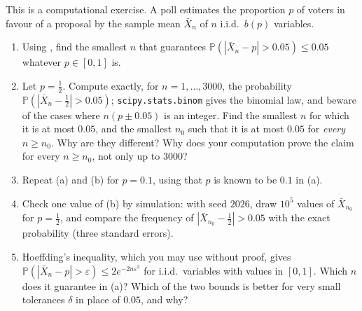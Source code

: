\begin{exercise}\label{ex:ll-chebyshev-bernoulli}
\medium This is a computational exercise. A poll estimates the proportion $p$ of voters in favour
of a proposal by the sample mean $\bar X_n$ of $n$ i.i.d.\ $b(p)$ variables.
\begin{enumerate}[label=(\alph*)]
  \item Using , find the smallest $n$ that guarantees
    $\mathbb P(|\bar X_n-p|>0.05)\le0.05$ whatever $p\in[0,1]$ is.
  \item Let $p=\frac12$. Compute exactly, for $n=1,\dots,3000$, the probability
    $\mathbb P(|\bar X_n-\frac12|>0.05)$; \texttt{scipy.stats.binom} gives the binomial law, and
    beware of the cases where $n(p\pm0.05)$ is an integer. Find the smallest $n$ for which it is at most $0.05$, and the
    smallest $n_0$ such that it is at most $0.05$ for \emph{every} $n\ge n_0$. Why are they different? Why does
    your computation prove the claim for every $n\ge n_0$, not only up to $3000$?
  \item Repeat (a) and (b) for $p=0.1$, using that $p$ is known to be $0.1$ in (a).
  \item Check one value of (b) by simulation: with seed $2026$, draw $10^5$ values of
    $\bar X_{n_0}$ for $p=\frac12$, and compare the frequency of $|\bar X_{n_0}-\frac12|>0.05$
    with the exact probability (three standard errors).
  \item Hoeffding's inequality, which you may use without proof, gives
    $\mathbb P(|\bar X_n-p|>\varepsilon)\le2e^{-2n\varepsilon^2}$ for i.i.d.\ variables with values
    in $[0,1]$. Which $n$ does it guarantee in (a)? Which of the two bounds is better for very
    small tolerances $\delta$ in place of $0.05$, and why?
\end{enumerate}
\end{exercise}

